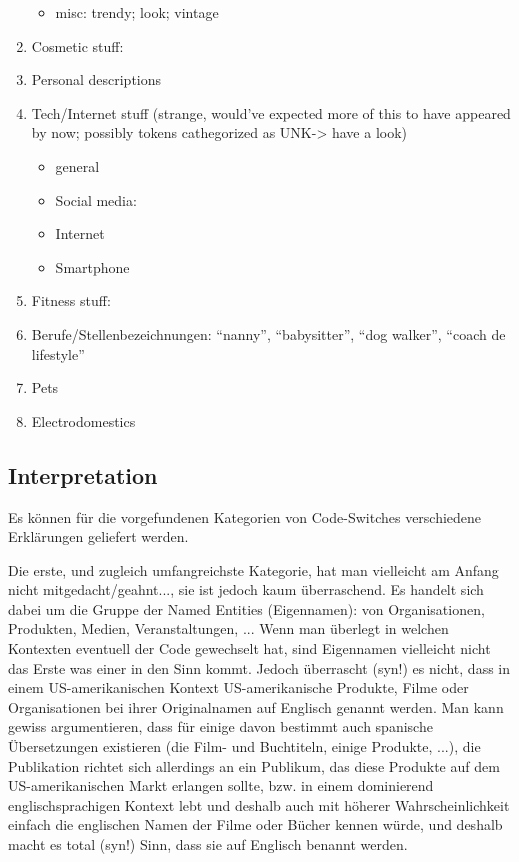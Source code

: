 \begin{enumerate}
\begin{itemize}
      \item misc: trendy; look; vintage
    \end{itemize}
  \item Cosmetic stuff:
  \item Personal descriptions
  \item Tech/Internet stuff (strange, would've expected more of this to have appeared by now; possibly tokens cathegorized as UNK-> have a look)
    \begin{itemize}
      \item general
      \item Social media:
      \item Internet
      \item Smartphone
    \end{itemize}
  \item Fitness stuff:
  \item Berufe/Stellenbezeichnungen: ``nanny'', ``babysitter'', ``dog walker'', ``coach de lifestyle''
  \item Pets
  \item Electrodomestics
\end{enumerate}

\subsection{Interpretation}

Es können für die vorgefundenen Kategorien von Code-Switches verschiedene Erklärungen geliefert werden.

Die erste, und zugleich umfangreichste Kategorie, hat man vielleicht am Anfang nicht mitgedacht/geahnt..., sie ist jedoch kaum überraschend.
Es handelt sich dabei um die Gruppe der Named Entities (Eigennamen): von Organisationen, Produkten, Medien, Veranstaltungen, ...
Wenn man überlegt in welchen Kontexten eventuell der Code gewechselt hat, sind Eigennamen vielleicht nicht das Erste was einer in den Sinn kommt.
Jedoch überrascht (syn!) es nicht, dass in einem US-amerikanischen Kontext US-amerikanische Produkte, Filme oder Organisationen bei ihrer Originalnamen auf Englisch genannt werden.
Man kann gewiss argumentieren, dass für einige davon bestimmt auch spanische Übersetzungen existieren (die Film- und Buchtiteln, einige Produkte, ...), die Publikation richtet sich allerdings an ein Publikum, das diese Produkte auf dem US-amerikanischen Markt erlangen sollte, bzw. in einem dominierend englischsprachigen Kontext lebt und deshalb auch mit höherer Wahrscheinlichkeit einfach die englischen Namen der Filme oder Bücher kennen würde, und deshalb macht es total (syn!) Sinn, dass sie auf Englisch benannt werden.

